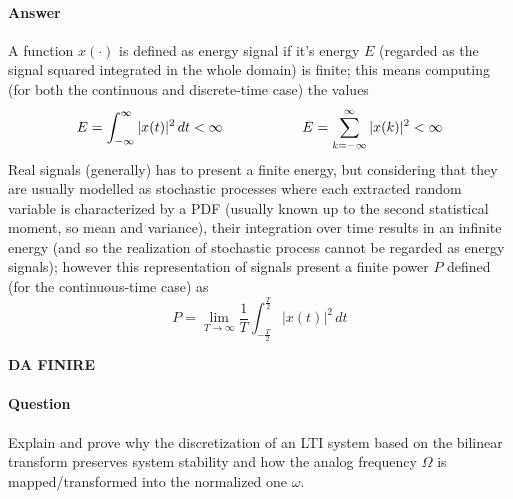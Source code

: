 	\paragraph{Answer} A function $x(\cdot)$ is defined as energy signal if it's energy $E$ (regarded as the signal squared integrated in the whole domain) is finite; this means computing (for both the continuous and discrete-time case) the values
	\[ E = \int_{-\infty}^\infty |x(t)|^2\, dt < \infty \hspace{2cm} E = \sum_{k=-\infty}^\infty |x(k)|^2 < \infty \]
	Real signals (generally) has to present  a finite energy, but considering that they are usually modelled as stochastic processes where each extracted random variable is characterized by a PDF (usually known up to the second statistical moment, so mean and variance), their integration over time results in an infinite energy (and so the realization of stochastic process cannot be regarded as energy signals); however this representation of signals present a finite power $P$ defined (for the continuous-time case) as
	\[ P = \lim_{T\rightarrow\infty} \frac 1 T\int_{-\frac T2}^{\frac T2} |x(t)|^2\, dt \]
	
	\textbf{DA FINIRE}
	
\newquestion
	\paragraph{Question} Explain and prove why the discretization of an LTI system based on the bilinear transform preserves system stability and how the analog frequency $\Omega$ is mapped/transformed into the normalized one $\omega$.

	

